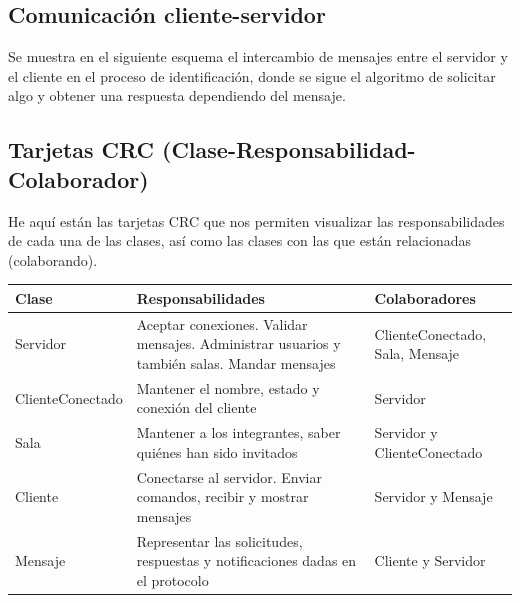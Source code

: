 \documentclass[12pt,a4paper]{article}
\begin{document}
\subsection*{Comunicación cliente-servidor}
Se muestra en el siguiente esquema el intercambio de mensajes entre el servidor
y el cliente en el proceso de identificación, donde se sigue el algoritmo
de solicitar algo y obtener una respuesta dependiendo del mensaje.

\begin{center}
\end{center}

\subsection*{Tarjetas CRC (Clase-Responsabilidad-Colaborador)}

\noindent He aquí están las tarjetas CRC que nos permiten visualizar las
responsabilidades de cada una de las clases, así como las clases con las
que están relacionadas (colaborando).\\

\noindent \begin{tabularx}{\textwidth}{|>{\raggedright\arraybackslash}p{}|X|X|}
\hline
\textbf{Clase} & \textbf{Responsabilidades} & \textbf{Colaboradores}\\
\hline
Servidor & Aceptar conexiones. Validar mensajes. Administrar usuarios y también salas. Mandar mensajes & ClienteConectado, Sala, Mensaje\\
\hline
ClienteConectado & Mantener el nombre, estado y conexión del cliente & Servidor\\
\hline
Sala & Mantener a los integrantes, saber quiénes han sido invitados & Servidor y ClienteConectado\\
\hline
Cliente & Conectarse al servidor. Enviar comandos, recibir y mostrar mensajes & Servidor y Mensaje\\
\hline
Mensaje & Representar las solicitudes, respuestas y notificaciones dadas en el protocolo & Cliente y Servidor\\
\hline
\end{tabularx}
\end{document}
